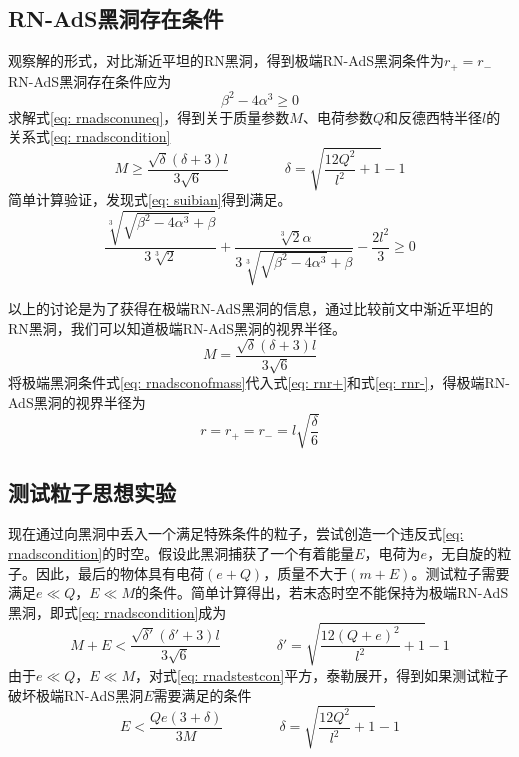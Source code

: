 \subsection{RN-AdS黑洞存在条件}
观察解的形式，对比渐近平坦的RN黑洞，得到极端RN-AdS黑洞条件为$r_+=r_-$RN-AdS黑洞存在条件应为
\begin{equation}\label{eq: rnadsconuneq}
    \beta^2-4\alpha^3 \geq 0
\end{equation}
求解式\eqref{eq: rnadsconuneq}，得到关于质量参数$M$、电荷参数$Q$和反德西特半径$l$的关系式\eqref{eq: rnadscondition}
\begin{equation}\label{eq: rnadscondition}
    M \geq \frac{\sqrt{\delta } (\delta +3) l}{3 \sqrt{6}} \qquad\qquad  \delta= \sqrt{\frac{12 Q^2}{l^2}+1}-1 
\end{equation}
简单计算验证，发现式\eqref{eq: suibian}得到满足。
\begin{equation}\label{eq: suibian}
    \frac{\sqrt[3]{\sqrt{\beta^2-4 \alpha^3}+\beta}}{3\sqrt[3]{2}}+\frac{\sqrt[3]{2} \alpha}{3 \sqrt[3]{\sqrt{\beta^2-4\alpha^3}+\beta}}-\frac{2 l^2}{3} \geq 0
\end{equation}

以上的讨论是为了获得在极端RN-AdS黑洞的信息，通过比较前文中渐近平坦的RN黑洞，我们可以知道极端RN-AdS黑洞的视界半径。
\begin{equation}\label{eq: rnadsconofmass}
    M=\frac{\sqrt{\delta } (\delta +3) l}{3 \sqrt{6}}
\end{equation}
将极端黑洞条件式\eqref{eq: rnadsconofmass}代入式\eqref{eq: rnr+}和式\eqref{eq: rnr-}，得极端RN-AdS黑洞的视界半径为
\begin{equation}\label{eq: rnadshorizonex}
    r=r_+=r_-=l\sqrt{\frac{\delta}{6}} 
\end{equation}
\subsection{测试粒子思想实验}
现在通过向黑洞中丢入一个满足特殊条件的粒子，尝试创造一个违反式\eqref{eq: rnadscondition}的时空。假设此黑洞捕获了一个有着能量$E$，电荷为$e$，无自旋的粒子。因此，最后的物体具有电荷$\left(e+Q\right)$，质量不大于$\left(m+E\right)$。测试粒子需要满足$e\ll Q$，$E\ll M$的条件。简单计算得出，若末态时空不能保持为极端RN-AdS黑洞，即式\eqref{eq: rnadscondition}成为
\begin{equation}\label{eq: rnadstestcon}
    M+E < \frac{\sqrt{\delta' } (\delta' +3) l}{3 \sqrt{6}} \quad\quad\quad\quad  \delta'= \sqrt{\frac{12 \left(Q+e\right)^2}{l^2}+1}-1
\end{equation}
由于$e\ll Q$，$E\ll M$，对式\eqref{eq: rnadstestcon}平方，泰勒展开，得到如果测试粒子破坏极端RN-AdS黑洞$E$需要满足的条件
\begin{equation}\label{eq: rnadsdiscon}
    E < \frac{Q e \left(3+\delta\right)}{3M} \qquad\qquad  \delta= \sqrt{\frac{12 Q^2}{l^2}+1}-1
\end{equation}


